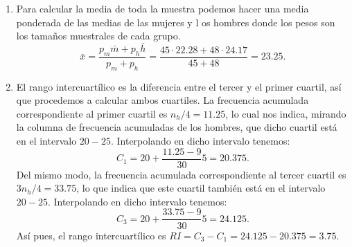 {\begin{enumerate}
Así pues, ambas muestras tienen un coeficiente de variación bajo y por tanto las medias son muy representativas, pero lo es un poco más la de los hombres ya que tienen una poca menos dispersión.

\item Para calcular la media de toda la muestra podemos hacer una media ponderada de las medias de las mujeres y l
os hombres donde los pesos son los tamaños muestrales de cada grupo.
\[
\bar{x}=\frac{p_m\bar{m}+p_h\bar{h}}{p_m+p_h}=\frac{45\cdot 22.28+48\cdot 24.17}{45+48}=23.25.
\]

\item El rango intercuartílico es la diferencia entre el tercer y el primer cuartil, así que procedemos a calcular ambos cuartiles.
La frecuencia acumulada correspondiente al primer cuartil es $n_h/4=11.25$, lo cual nos indica, mirando la columna de frecuencia acumuladas de los hombres, que dicho cuartil está en el intervalo $20-25$.
Interpolando en dicho intervalo tenemos:
\[C_1=20+\frac{11.25-9}{30}5 = 20.375.\]
Del mismo modo, la frecuencia acumulada correspondiente al tercer cuartil es $3n_h/4=33.75$, lo que indica que este cuartil también está en el intervalo $20-25$.
Interpolando en dicho intervalo tenemos:
\[C_3=20+\frac{33.75-9}{30}5 = 24.125.\]
Así pues, el rango intercuartílico es $RI=C_3-C_1=24.125-20.375=3.75$.
\end{enumerate}
}


